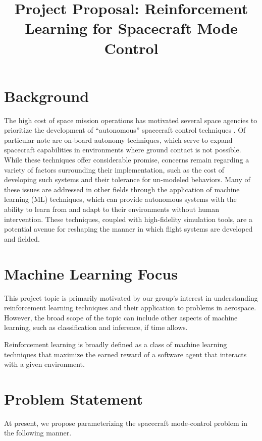 \documentclass[]{article}
\title{Project Proposal: Reinforcement Learning for Spacecraft Mode Control}
\author{}
\begin{document}
\maketitle

\begin{abstract}

\end{abstract}

\section{Background}

The high cost of space mission operations has motivated several space agencies to prioritize the development of ``autonomous'' spacecraft control techniques \cite{Pecheur2000}. Of particular note are on-board autonomy techniques, which serve to expand spacecraft capabilities in environments where ground contact is not possible. While these techniques offer considerable promise, concerns remain regarding a variety of factors surrounding their implementation, such as the cost of developing such systems and their tolerance for un-modeled behaviors\cite{Starek2016}. Many of these issues are addressed in other fields through the application of machine learning (ML) techniques, which can provide autonomous systems with the ability to learn from and adapt to their environments without human intervention. These techniques, coupled with high-fidelity simulation tools, are a potential avenue for reshaping the manner in which flight systems are developed and fielded. 


\section{Machine Learning Focus}

This project topic is primarily motivated by our group's interest in understanding reinforcement learning techniques and their application to problems in aerospace. However, the broad scope of the topic can include other aspects of machine learning, such as classification and inference, if time allows. 

Reinforcement learning is broadly defined as a class of machine learning techniques that maximize the earned reward of a software agent that interacts with a given environment. 

\section{Problem Statement}
At present, we propose parameterizing the spacecraft mode-control problem in the following manner. 
\end{document}
